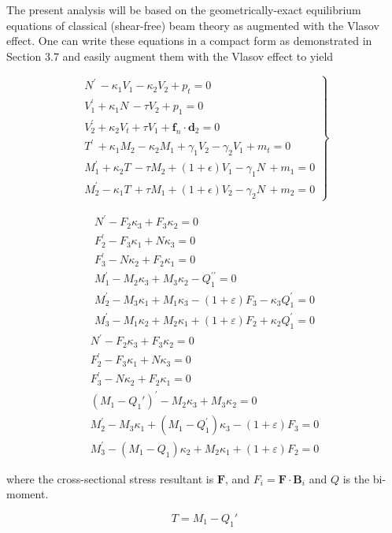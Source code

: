 The present analysis will be based on the geometrically-exact equilibrium equations of classical (shear-free) beam theory as augmented with the Vlasov effect. 
One can write these equations in a compact form as demonstrated in Section 3.7 and easily augment them with the Vlasov effect to yield

$$
\left.
\begin{aligned}
N^{\prime}\,-\kappa_1 V_1-\kappa_2 V_2+p_t=0 \\
V_1^{\prime}+\kappa_1 N\,- \tau V_2 + p_1 = 0 \\
V_2^{\prime}+\kappa_2 V_t+ \tau V_1 + \bm{f}_n\cdot \mathbf{d}_2 = 0 \\
T^{\prime}\,+\kappa_1 M_2-\kappa_2 M_1+\gamma_1 V_2-\gamma_2 V_1 + m_t=0 \\
M_1^{\prime}+\kappa_2 T\, - \tau M_2 + \left(1+\epsilon\right) V_1-\gamma_1 N\,+m_1=0 \\
M_2^{\prime}-\kappa_1 T\, + \tau M_1 + \left(1+\epsilon\right) V_2-\gamma_2 N\,+m_2=0
\end{aligned}
\right\}
$$

$$
\begin{array}{r}
N^{\prime}-F_2 \kappa_3+F_3 \kappa_2=0 \\
F_2^{\prime}-F_3 \kappa_1+N \kappa_3=0 \\
F_3^{\prime}-N \kappa_2+F_2 \kappa_1=0 \\
M_1^{\prime}-M_2 \kappa_3+M_3 \kappa_2-Q_1^{\prime \prime}=0 \\
M_2^{\prime}-M_3 \kappa_1+M_1 \kappa_3-(1+\varepsilon) F_3-\kappa_3 Q_1^{\prime}=0 \\
M_3^{\prime}-M_1 \kappa_2+M_2 \kappa_1+(1+\varepsilon) F_2+\kappa_2 Q_1^{\prime}=0
\end{array}
$$
$$
\begin{array}{r}
N^{\prime}-F_2 \kappa_3+F_3 \kappa_2=0 \\
F_2^{\prime}-F_3 \kappa_1+N \kappa_3=0 \\
F_3^{\prime}-N \kappa_2+F_2 \kappa_1=0 \\
(M_1 - Q_1')^{\prime}-M_2 \kappa_3+M_3 \kappa_2=0 \\
M_2^{\prime}-M_3 \kappa_1+(M_1- Q_1^{\prime}) \kappa_3-(1+\varepsilon) F_3=0 \\
M_3^{\prime} - (M_1- Q_1) \kappa_2+M_2 \kappa_1+(1+\varepsilon) F_2=0
\end{array}
$$

where the cross-sectional stress resultant is $\mathbf{F}$, and $F_i=\mathbf{F} \cdot \mathbf{B}_i$ and $Q$ is the bi-moment.

$$
T = M_1 - Q_1'
$$